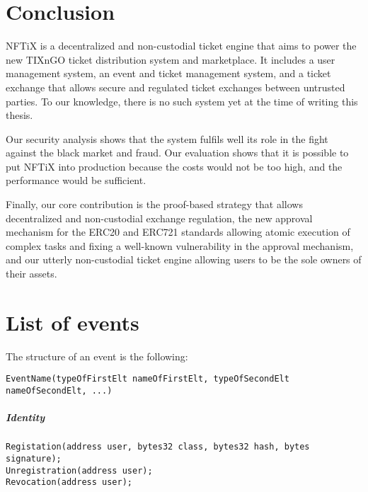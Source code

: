 \documentclass[a4paper,11pt,oneside]{report}
\begin{document}
\chapter{Conclusion}
NFTiX is a decentralized and non-custodial ticket engine that aims to power the new TIXnGO ticket distribution system and marketplace. It includes a user management system, an event and ticket management system, and a ticket exchange that allows secure and regulated ticket exchanges between untrusted parties. To our knowledge, there is no such system yet at the time of writing this thesis.

Our security analysis shows that the system fulfils well its role in the fight against the black market and fraud. Our evaluation shows that it is possible to put NFTiX into production because the costs would not be too high, and the performance would be sufficient.

Finally, our core contribution is the proof-based strategy that allows decentralized and non-custodial exchange regulation, the new approval mechanism for the ERC20 and ERC721 standards allowing atomic execution of complex tasks and fixing a well-known vulnerability in the approval mechanism, and our utterly non-custodial ticket engine allowing users to be the sole owners of their assets.

\cleardoublepage
{}
{}
\nocite{*}
\printbibliography

\appendix
\chapter{List of events}
\label{sec:appendix_a}

The structure of an event is the following: 
\begin{verbatim}
EventName(typeOfFirstElt nameOfFirstElt, typeOfSecondElt nameOfSecondElt, ...)
\end{verbatim}

\paragraph{Identity}
\begin{verbatim}
Registation(address user, bytes32 class, bytes32 hash, bytes signature);
Unregistration(address user);
Revocation(address user);
\end{verbatim}
\end{document}
